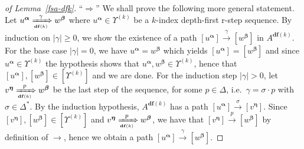 \documentclass[final]{llncs}
\def\age#1{\left[#1\right]}
\def\len#1{{\vert{#1}\vert}}
\def\prod{\Delta}
\def\df#1{\scriptscriptstyle\mathbf{df}(#1)}
\def\bdwords{\Upsilon}
\begin{document}
\begin{proof}[of Lemma~\ref{fsa-dfk}]
  \noindent ``$\Rightarrow$'' We shall prove the following more
  general
  statement. Let \(u^{\boldsymbol{\alpha}} \xRightarrow[\df{k}]{\gamma}
  w^{\boldsymbol{\beta}}\)
  where \(u^{\boldsymbol{\alpha}} \in \bdwords^{(k)}\) be
  a \(k\)-index depth-first r-step sequence. By induction
  on \(\len{\gamma}\geq 0\), we show the existence of a
  path \(\age{u^{\boldsymbol{\alpha}}}\xrightarrow{\gamma} \age{w^{\boldsymbol{\beta}}}\)
  in \(A^{\df{k}}\).  For the base case \(\len{\gamma}=0\), we
  have \(u^{\boldsymbol{\alpha}} = w^{\boldsymbol{\beta}}\) which
  yields \(\age{u^{\boldsymbol{\alpha}}}=\age{w^{\boldsymbol{\beta}}}\)
  and since \(u^{\boldsymbol{\alpha}}\in\bdwords^{(k)}\) the
  hypothesis shows
  that \(u^{\boldsymbol{\alpha}},w^{\boldsymbol{\beta}}\in\bdwords^{(k)}\),
  hence
  that \(\age{u^{\boldsymbol{\alpha}}},\age{w^{\boldsymbol{\beta}}}\in\age{\bdwords^{(k)}}\)
  and we are done. For the induction step \(\len{\gamma}>0\), let \(
  v^{\boldsymbol{\eta}} \xRightarrow[\df{k}]{p}
  w^{\boldsymbol{\beta}} \) be the last step of the sequence, for
  some \( p \in \prod\), i.e.\ \(\gamma=\sigma \cdot p\)
  with \(\sigma\in\prod^*\). By the induction
  hypothesis, \(A^{\df{k}}\) has a
  path \(\age{u^{\boldsymbol{\alpha}}} \xrightarrow{\sigma} \age{v^{\boldsymbol{\eta}}}\).
  Since \(\age{v^{\boldsymbol{\eta}}}, \age{w^{\boldsymbol{\beta}}} \in \age{\bdwords^{(k)}}\)
  and \( v^{\boldsymbol{\eta}} \xRightarrow[\df{k}]{p}
  w^{\boldsymbol{\beta}}\), we have
  that \( \age{v^{\boldsymbol{\eta}}} \xrightarrow{p} \age{w^{\boldsymbol{\beta}}} \)
  by definition of \(\rightarrow\), hence we obtain a
  path \( \age{u^{\boldsymbol{\alpha}}} \xrightarrow{\gamma} \age{w^{\boldsymbol{\beta}}}\).
	

\end{proof}
\end{document}
